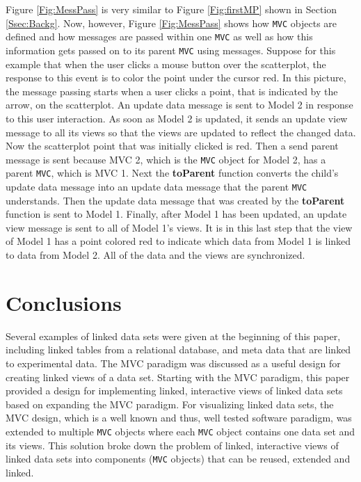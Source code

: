 \documentclass{article}[11pt]
\newcommand{\Rfunction}[1]{{\textbf{#1}}}
\newcommand{\Robject}[1]{{\texttt{#1}}}
\begin{document}
Figure \ref{Fig:MessPass} is very similar to Figure \ref{Fig:firstMP} shown in
Section \ref{Ssec:Backg}.  Now, however, Figure \ref{Fig:MessPass} shows how
\Robject{MVC} objects are defined and how messages are passed within one
\Robject{MVC} as well as how this information gets passed on to its parent
\Robject{MVC} using messages.  Suppose for this example that when the user
clicks a mouse button over the scatterplot, the response to this event is to
color the point under the cursor 
red.  In this picture, the message passing starts when a user clicks a point,
that is indicated by the arrow, on the scatterplot.  An update data message is
sent to Model 2 in response to this user interaction.  As soon as Model 2 is
updated, it sends an update view message to all its views so that the views
are updated to reflect the changed data.  Now the scatterplot point that was
initially clicked is red.  Then a send parent message is sent because MVC
2, which is the \Robject{MVC} object for Model 2, has a parent \Robject{MVC},
which is MVC 1.  Next the \Rfunction{toParent} function converts the child's
update data message into an update data message that the parent \Robject{MVC}
understands.  Then the update data message that was created by the
\Rfunction{toParent} function is sent to Model 1.  Finally, after Model 1 has
been updated, an update view message is sent to all of Model 1's views.  It is
in this last step that the view of Model 1 has a point colored red to indicate
which data from Model 1 is linked to data from Model 2.  All of the data and
the views are synchronized. 

\section{Conclusions}\label{Sec:Conc}

Several examples of linked data sets were given at the beginning of this
paper, including linked tables from a relational database, and meta data that
are linked to experimental data.  The MVC paradigm was
discussed as a useful design for creating linked views of a data set.
Starting with the MVC paradigm, this paper provided a design for implementing
linked, interactive views of linked data sets based on expanding the MVC
paradigm.  For visualizing linked data sets, the MVC design, which is a well
known and thus, well tested software paradigm, was extended to multiple
\Robject{MVC} objects where each \Robject{MVC} object contains one data set
and its views.  This solution broke down the problem of linked, interactive
views of linked data sets into components (\Robject{MVC} objects) that can be
reused, extended and linked. 
\end{document}
